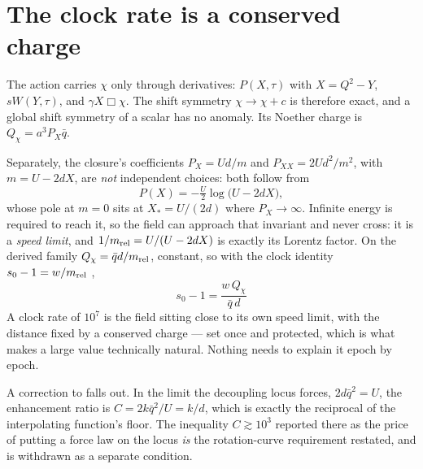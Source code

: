 \documentclass[11pt,letterpaper]{article}
\begin{document}
\section{The clock rate is a conserved charge}
The action \cite{paper13} carries $\chi$ only through derivatives: $P(X,\tau)$ with $X=Q^2-Y$, $sW(Y,\tau)$, and $\gamma X\Box\chi$. The shift symmetry $\chi\to\chi+c$ is therefore exact, and a global shift symmetry of a scalar has no anomaly. Its Noether charge is $Q_\chi=a^3P_X\bar q$.

Separately, the closure's coefficients $P_X=Ud/m$ and $P_{XX}=2Ud^2/m^2$, with $m=U-2dX$, are \emph{not} independent choices: both follow from
\begin{equation}
P(X)=-\tfrac{U}{2}\log\!\big(U-2dX\big),
\end{equation}
whose pole at $m=0$ sits at $X_*=U/(2d)$ where $P_X\to\infty$. Infinite energy is required to reach it, so the field can approach that invariant and never cross: it is a \emph{speed limit}, and $1/m_{\rm rel}=U/(U-2dX)$ is exactly its Lorentz factor. On the derived family $Q_\chi=\bar qd/m_{\rm rel}$, constant, so with the clock identity $s_0-1=w/m_{\rm rel}$ \cite{paper21},
\begin{equation}
\boxed{\;s_0-1=\frac{w\,Q_\chi}{\bar q\,d}\;}
\end{equation}
A clock rate of $10^7$ is the field sitting close to its own speed limit, with the distance fixed by a conserved charge --- set once and protected, which is what makes a large value technically natural. Nothing needs to explain it epoch by epoch.

A correction to \cite{paper24} falls out. In the limit the decoupling locus forces, $2d\bar q^2=U$, the enhancement ratio is $C=2k\bar q^2/U=k/d$, which is exactly the reciprocal of the interpolating function's floor. The inequality $C\gtrsim10^3$ reported there as the price of putting a force law on the locus \emph{is} the rotation-curve requirement restated, and is withdrawn as a separate condition.
\end{document}
